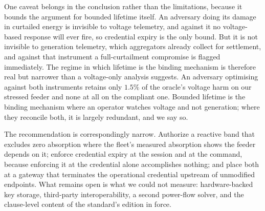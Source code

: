 One caveat belongs in the conclusion rather than the limitations, because it bounds the argument
for bounded lifetime itself. An adversary doing its damage in curtailed energy is invisible to
voltage telemetry, and against it no voltage-based response will ever fire, so credential
expiry is the only bound. But it is not invisible to generation telemetry, which aggregators
already collect for settlement, and against that instrument a full-curtailment compromise is
flagged immediately. The regime in which lifetime is the binding mechanism is therefore real but
narrower than a voltage-only analysis suggests. An adversary optimising against both instruments
retains only $1.5\%$ of the oracle's voltage harm on our stressed feeder and none at all on the
compliant one. Bounded lifetime is the binding mechanism where an operator watches voltage and not
generation; where they reconcile both, it is largely redundant, and we say so.

The recommendation is correspondingly narrow. Authorize a reactive band that excludes zero
absorption where the fleet's measured absorption shows the feeder depends on it; enforce credential
expiry at the session and at the command, because enforcing it at the credential alone accomplishes
nothing; and place both at a gateway that terminates the operational credential upstream of
unmodified endpoints. What remains open is what we could not measure: hardware-backed key storage,
third-party interoperability, a second power-flow solver, and the clause-level content of the
standard's edition in force.
